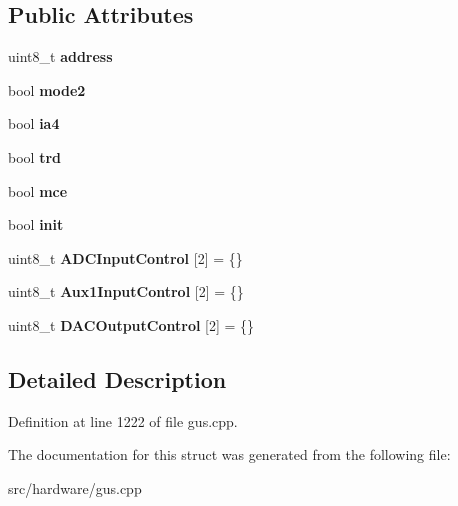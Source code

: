 \subsection*{Public Attributes}
\begin{DoxyCompactItemize}
\item 
\hypertarget{structgus__cs4231_a854196e166728ab338bd4dc1825e5376}{uint8\-\_\-t {\bfseries address}}\label{structgus__cs4231_a854196e166728ab338bd4dc1825e5376}

\item 
\hypertarget{structgus__cs4231_a1a0f1c8241e22df8912de936d6dd36a2}{bool {\bfseries mode2}}\label{structgus__cs4231_a1a0f1c8241e22df8912de936d6dd36a2}

\item 
\hypertarget{structgus__cs4231_ac856e0ff138f97283412af3a660ae48f}{bool {\bfseries ia4}}\label{structgus__cs4231_ac856e0ff138f97283412af3a660ae48f}

\item 
\hypertarget{structgus__cs4231_a98abeed198155481a7acbf4816affc16}{bool {\bfseries trd}}\label{structgus__cs4231_a98abeed198155481a7acbf4816affc16}

\item 
\hypertarget{structgus__cs4231_a6fc11df0fe6de72eaac011a4eaeb506e}{bool {\bfseries mce}}\label{structgus__cs4231_a6fc11df0fe6de72eaac011a4eaeb506e}

\item 
\hypertarget{structgus__cs4231_a1e1427d7fdd2d24972074cd552ea1e1f}{bool {\bfseries init}}\label{structgus__cs4231_a1e1427d7fdd2d24972074cd552ea1e1f}

\item 
\hypertarget{structgus__cs4231_a555b8f8e51d7a01912a32d399e50e264}{uint8\-\_\-t {\bfseries A\-D\-C\-Input\-Control} \mbox{[}2\mbox{]} = \{\}}\label{structgus__cs4231_a555b8f8e51d7a01912a32d399e50e264}

\item 
\hypertarget{structgus__cs4231_ac5339efcc287958ad556d9fc7a590876}{uint8\-\_\-t {\bfseries Aux1\-Input\-Control} \mbox{[}2\mbox{]} = \{\}}\label{structgus__cs4231_ac5339efcc287958ad556d9fc7a590876}

\item 
\hypertarget{structgus__cs4231_aecf705a077583ef50851864d5dd7ef53}{uint8\-\_\-t {\bfseries D\-A\-C\-Output\-Control} \mbox{[}2\mbox{]} = \{\}}\label{structgus__cs4231_aecf705a077583ef50851864d5dd7ef53}

\end{DoxyCompactItemize}


\subsection{Detailed Description}


Definition at line 1222 of file gus.\-cpp.



The documentation for this struct was generated from the following file\-:\begin{DoxyCompactItemize}
\item 
src/hardware/gus.\-cpp\end{DoxyCompactItemize}
